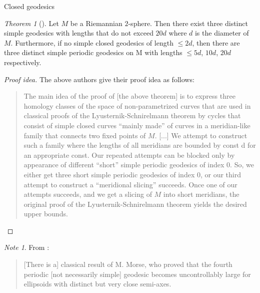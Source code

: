 \documentclass{article}
\theoremstyle{definition}
\theoremstyle{remark}
\newtheorem{remark}{Note}[section]
\newtheorem{theorem}{Theorem}[section]
\begin{document}
\begin{section}{Closed geodesics}
  \begin{theorem}[\cite{Liokumovich}]
    Let $M$ be a Riemannian $2$-sphere. Then there exist three distinct simple
    geodesics with lengths that do not exceed $20d$ where $d$ is the diameter
    of $M$.
    Furthermore, if no simple closed geodesics of length $\leq 2d$, then there
    are three distinct simple periodic geodesics on M with lengths
    $\leq 5d$, $10d$,  $20d$ respectively.
  \end{theorem}
  \begin{proof}[Proof idea]
    The above authors give their proof idea as follows: \begin{quote}
      The main idea of the proof of [the above theorem] is to express three homology
      classes of the space of non-parametrized curves that are used in classical
      proofs of the Lyusternik-Schnirelmann theorem by cycles that consist of
      simple closed curves ``mainly made'' of curves in a meridian-like family
      that connects two fixed points of $M$. [...] We attempt to construct such
      a family where the lengths of all meridians are bounded by const d for an
      appropriate const. Our repeated attempts can be blocked only by appearance
      of different “short” simple periodic geodesics of index 0. So, we either
      get three short simple periodic geodesics of index 0, or our third attempt
      to construct a “meridional slicing” succeeds. Once one of our attempts
      succeeds, and we get a slicing of $M$ into short meridians, the original
      proof of the Lyusternik-Schnirelmann theorem yields the desired upper
      bounds.
    \end{quote}
  \end{proof}
  \begin{remark}
    From \cite{Liokumovich}:
    \begin{quote}
      [There is a] classical result of M. Morse, who proved that the fourth periodic
      [not necessarily simple] geodesic becomes uncontrollably large for
      ellipsoids with distinct but very close semi-axes.
    \end{quote}
  \end{remark}
\end{section}
\printbibliography
\end{document}
